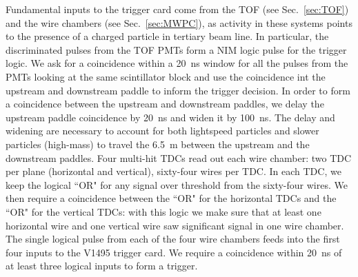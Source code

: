 Fundamental inputs to the trigger card come from the TOF (see Sec.~\ref{sec:TOF}) and the wire chambers (see Sec.~\ref{sec:MWPC}), as activity in these systems points to the presence of a charged particle in tertiary beam line.
In particular, the discriminated pulses from the TOF PMTs form a NIM logic pulse for the trigger logic. We ask for a coincidence within a 20~ns window for all the pulses from the PMTs looking at the same scintillator block and use the coincidence int the upstream and downstream paddle to inform the trigger decision. In order to form a coincidence between the upstream and downstream paddles, we delay the upstream paddle coincidence by 20~ns and widen it by 100~ns. The delay and widening are necessary to account for both  lightspeed particles and slower particles (high-mass) to travel the 6.5~m between the upstream and the downstream paddles. 
Four multi-hit TDCs read out each wire chamber: two TDC per plane (horizontal and vertical), sixty-four wires per TDC. In each TDC, we keep the logical ``OR" for any signal over threshold from the sixty-four wires. We then require a coincidence between the ``OR" for the horizontal TDCs and the ``OR" for the vertical TDCs: with this logic we make sure that at least one horizontal wire and one vertical wire saw significant signal in one wire chamber.  The single logical pulse from each of the four wire chambers feeds into the first four inputs to the V1495 trigger card. We require a coincidence within 20~ns of at least three logical inputs to form a trigger.





